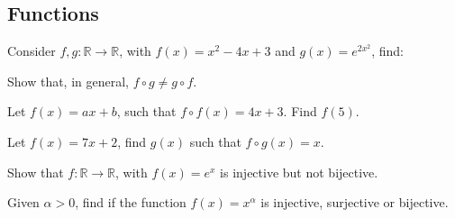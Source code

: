 \documentclass[answers]{exam}
\begin{document}
\begin{questions}

\section*{Functions}

\question Consider $f,g:\mathbb{R}\rightarrow\mathbb{R}$, with $f(x)=x^2-4x+3$ and $g(x)=e^{2x^2}$, find:


\question Show that, in general, $f\circ g\neq g\circ f$.

\question Let $f(x)=ax+b$, such that $f\circ f(x)=4x+3$. Find $f(5)$.

\question Let $f(x)=7x+2$, find $g(x)$ such that $f\circ g (x)=x$.

\question Show that $f:\mathbb{R}\rightarrow\mathbb{R}$, with $f(x)=e^x$ is injective but not bijective.

\question Given $\alpha>0$, find if the function $f(x)=x^\alpha$ is injective, surjective or bijective.


\end{questions}
\end{document}
